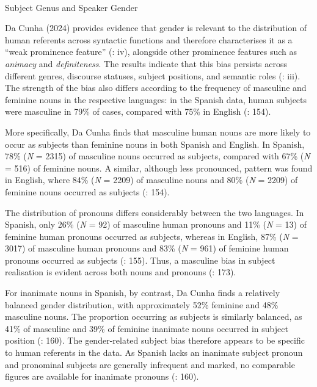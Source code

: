 \documentclass[
  letterpaper,
  DIV=11,
  numbers=noendperiod]{scrartcl}
\makeatletter
\let\oldparagraph\paragraph
\renewcommand{\paragraph}{
    \@ifstar
      \xxxParagraphStar
      \xxxParagraphNoStar
  }
\newcommand{\xxxParagraphStar}[1]{\oldparagraph*{#1}\mbox{}}
\newcommand{\xxxParagraphNoStar}[1]{\oldparagraph{#1}\mbox{}}
\makeatother
\begin{document}
\paragraph{Subject Genus and Speaker
Gender}\label{subject-genus-and-speaker-gender}

Da Cunha (2024) provides evidence that gender is relevant to the
distribution of human referents across syntactic functions and therefore
characterises it as a ``weak prominence feature''
(: iv), alongside other prominence
features such as \emph{animacy} and \emph{definiteness}. The results
indicate that this bias persists across different genres, discourse
statuses, subject positions, and semantic roles
(: iii). The strength of the bias also
differs according to the frequency of masculine and feminine nouns in
the respective languages: in the Spanish data, human subjects were
masculine in 79\% of cases, compared with 75\% in English
(: 154).

More specifically, Da Cunha finds that masculine human nouns are more
likely to occur as subjects than feminine nouns in both Spanish and
English. In Spanish, 78\% (\emph{N} = 2315) of masculine nouns occurred
as subjects, compared with 67\% (\emph{N} = 516) of feminine nouns. A
similar, although less pronounced, pattern was found in English, where
84\% (\emph{N} = 2209) of masculine nouns and 80\% (\emph{N} = 2209) of
feminine nouns occurred as subjects (: 154).

The distribution of pronouns differs considerably between the two
languages. In Spanish, only 26\% (\emph{N} = 92) of masculine human
pronouns and 11\% (\emph{N} = 13) of feminine human pronouns occurred as
subjects, whereas in English, 87\% (\emph{N} = 3017) of masculine human
pronouns and 83\% (\emph{N} = 961) of feminine human pronouns occurred
as subjects (: 155). Thus, a
masculine bias in subject realisation is evident across both nouns and
pronouns (: 173).

For inanimate nouns in Spanish, by contrast, Da Cunha finds a relatively
balanced gender distribution, with approximately 52\% feminine and 48\%
masculine nouns. The proportion occurring as subjects is similarly
balanced, as 41\% of masculine and 39\% of feminine inanimate nouns
occurred in subject position (: 160).
The gender-related subject bias therefore appears to be specific to
human referents in the data. As Spanish lacks an inanimate subject
pronoun and pronominal subjects are generally infrequent and marked, no
comparable figures are available for inanimate pronouns
(: 160).
\end{document}
